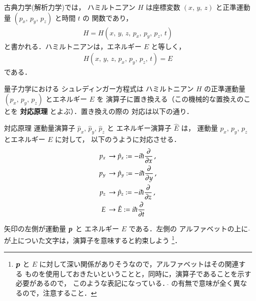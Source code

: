                 古典力学(解析力学)では，
                ハミルトニアン $H$ は座標変数 $(x,\,y,\,z)$ と正準運動量 $(p_{x},\,p_{y},\,p_{z})$ と時間 $t$ の
                関数であり，
                \begin{align}
                  H=H(x,\,y,\,z,\,p_{x},\,p_{y},\,p_{z},\,t)
                \end{align}
                と書かれる．ハミルトニアンは，エネルギー $E$ と等しく，
                \begin{align}
                  H(x,\,y,\,z,\,p_{x},\,p_{y},\,p_{z},\,t)=E
                \end{align}
                である．

                量子力学における
                シュレディンガー方程式は
                ハミルトニアン $H$ の正準運動量 $(p_{x},\,p_{y},\,p_{z})$ とエネルギー $E$ を
                演算子に置き換える（この機械的な置換えのことを \textbf{対応原理} とよぶ）．置き換えの際の
                対応は以下の通り．
                    \begin{myshadebox}{対応原理}
                      運動量演算子 $\hat{p}_{x},\,\hat{p}_{y},\,\hat{p}_{z}$ と
                      エネルギー演算子 $\hat{E}$ は，
                      運動量 ${p}_{x},\,{p}_{y},\,{p}_{z}$ とエネルギー $E$ に対して，
                      以下のうように対応させる．
                        \begin{align}
                          p_{x}\, &\rightarrow  \hat{p}_{x}:=-i\hbar\frac{\partial}{\partial x}\,, \\
                          p_{y}\, &\rightarrow  \hat{p}_{y}:=-i\hbar\frac{\partial}{\partial y}\,, \\
                          p_{z}\, &\rightarrow  \hat{p}_{z}:=-i\hbar\frac{\partial}{\partial z}\,, \\
                          E    \, &\rightarrow  \hat{E}:=i\hbar\frac{\partial}{\partial t}
                        \end{align}
                    \end{myshadebox}

                矢印の左側が運動量 $\boldsymbol{p}$ と エネルギー $E$ である．左側の
                アルファベットの上に $\hat{}$ が上についた文字は，演算子を意味すると約束しよう
                  \footnote{
                    $\boldsymbol{p}$ と $E$ に対して深い関係がありそうなので，アルファベットはその関連する
                    ものを使用しておきたいということと，同時に，演算子であることを示す必要があるので，
                    このような表記になっている．$\hat{}$ の有無で意味が全く異なるので，注意すること．
                  }．

